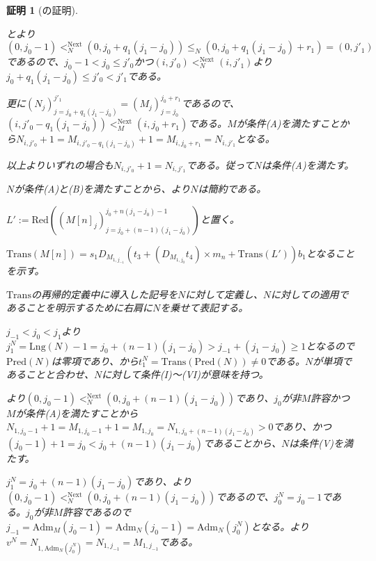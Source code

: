 \documentclass[dvipdfmx,uplatex]{jsarticle}
\theoremstyle{customnonumberbreakfortheorem}
\theoremstyle{customnonumberbreakforproof}
\newtheorem{hideableproof}{証明}
\begin{document}
\begin{hideableproof}[の証明]
\begin{indented}
\begin{indented}
\begin{indented}
				\item {}とより\((0,j_0-1) <_N^{\textrm{Next}} (0,j_0+q_1(j_1-j_0)) \leq_N (0,j_0+q_1(j_1-j_0)+r_1) = (0,j'_1)\)であるので、\(j_0-1 < j_0 \leq j'_0\)かつ\((i,j'_0) <_N^{\textrm{Next}} (i,j'_1)\)より\(j_0+q_1(j_1-j_0) \leq j'_0 < j'_1\)である。
				\item 更に\((N_j)_{j=j_0+q_1(j_1-j_0)}^{j'_1} = (M_j)_{j=j_0}^{j_0+r_1}\)であるので、\((i,j'_0-q_1(j_1-j_0)) <_M^{\textrm{Next}} (i,j_0+r_1)\)である。\(M\)が条件(A)を満たすことから\(N_{i,j'_0}+1 = M_{i,j'_0-q_1(j_1-j_0)}+1 = M_{i,j_0+r_1} = N_{i,j'_1}\)となる。
			\end{indented}
			\item 以上よりいずれの場合も\(N_{i,j'_0}+1 = N_{i,j'_1}\)である。従って\(N\)は条件(A)を満たす。
			\item \(N\)が条件(A)と(B)を満たすことから、より\(N\)は簡約である。
			\item
			\item \(L' := \textrm{Red}((M[n]_j)_{j=j_0+(n-1)(j_1-j_0)}^{j_0+n(j_1-j_0)-1})\)と置く。
			\item \(\textrm{Trans}(M[n]) = s_1 D_{M_{1,j_{-1}}}(t_3 + (D_{M_{1,j_0}} t_4) \times m_n + \textrm{Trans}(L')) b_1\)となることを示す。
			\item \(\textrm{Trans}\)の再帰的定義中に導入した記号を\(N\)に対して定義し、\(N\)に対しての適用であることを明示するために右肩に\(N\)を乗せて表記する。
			\item \(j_{-1} < j_0 < j_1\)より\(j_1^N = \textrm{Lng}(N)-1 = j_0+(n-1)(j_1-j_0) > j_{-1} + (j_1-j_0) \geq 1\)となるので\(\textrm{Pred}(N)\)は零項であり、から\(t_1^N = \textrm{Trans}(\textrm{Pred}(N)) \neq 0\)である。\(N\)が単項であることと合わせ、\(N\)に対して条件(I)～(VI)が意味を持つ。
			\item {}より\((0,j_0-1) <_N^{\textrm{Next}} (0,j_0+(n-1)(j_1-j_0))\)であり、\(j_0\)が非\(M\)許容かつ\(M\)が条件(A)を満たすことから\(N_{1,j_0-1}+1 = M_{1,j_0-1}+1 = M_{1,j_0} = N_{1,j_0+(n-1)(j_1-j_0)} > 0\)であり、かつ\((j_0-1)+1 = j_0 < j_0+(n-1)(j_1-j_0)\)であることから、\(N\)は条件(V)を満たす。
			\item \(j_1^N = j_0+(n-1)(j_1-j_0)\)であり、より\((0,j_0-1) <_N^{\textrm{Next}} (0,j_0+(n-1)(j_1-j_0))\)であるので、\(j_0^N = j_0-1\)である。\(j_0\)が非\(M\)許容であるので\(j_{-1} = \textrm{Adm}_M(j_0-1) = \textrm{Adm}_N(j_0-1) = \textrm{Adm}_N(j_0^N)\)となる。より\(v^N = N_{1,\textrm{Adm}_N(j_0^N)} = N_{1,j_{-1}} = M_{1,j_{-1}}\)である。

\end{indented}
\end{indented}
\end{hideableproof}
\end{document}
